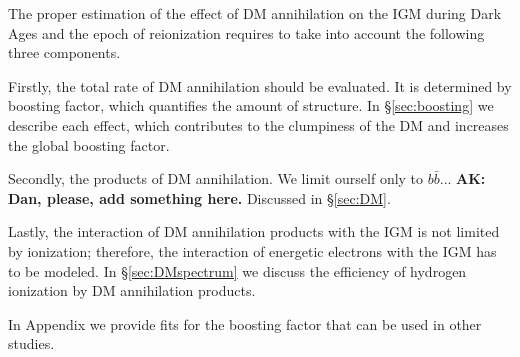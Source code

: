 The proper estimation of the effect of DM annihilation on the IGM during Dark Ages and the epoch of reionization requires to take into account the following three components.

Firstly, the total rate of DM annihilation should be evaluated. It is determined by boosting factor, which quantifies the amount of structure. In \S\ref{sec:boosting} we describe each effect, which contributes to the clumpiness of the DM and increases the global boosting factor.

Secondly, the products of DM annihilation. We limit ourself only to $b\bar{b}$...
\textbf{AK: Dan, please, add something here.} Discussed in \S\ref{sec:DM}.

Lastly, the interaction of DM annihilation products with the IGM is not limited by ionization; therefore, the interaction of energetic electrons with the IGM has to be modeled. In \S\ref{sec:DMspectrum} we discuss the efficiency of hydrogen ionization by DM annihilation products.

In Appendix we provide fits for the boosting factor that can be used in other studies.